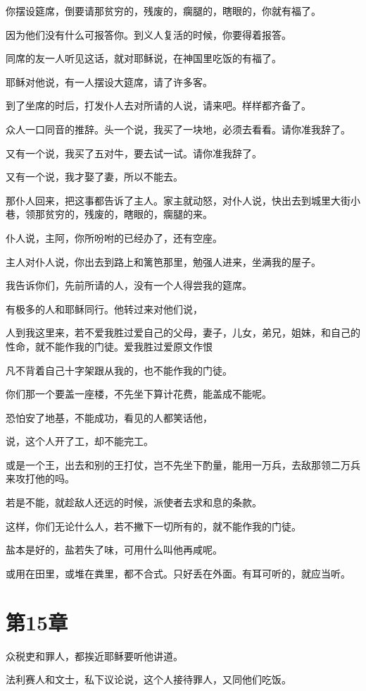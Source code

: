\documentclass[12pt,oneside]{book}
\begin{document}
你摆设筵席，倒要请那贫穷的，残废的，瘸腿的，瞎眼的，你就有福了。

因为他们没有什么可报答你。到义人复活的时候，你要得着报答。

同席的友一人听见这话，就对耶稣说，在神国里吃饭的有福了。

耶稣对他说，有一人摆设大筵席，请了许多客。

到了坐席的时后，打发仆人去对所请的人说，请来吧。样样都齐备了。

众人一口同音的推辞。头一个说，我买了一块地，必须去看看。请你准我辞了。

又有一个说，我买了五对牛，要去试一试。请你准我辞了。

又有一个说，我才娶了妻，所以不能去。

那仆人回来，把这事都告诉了主人。家主就动怒，对仆人说，快出去到城里大街小巷，领那贫穷的，残废的，瞎眼的，瘸腿的来。

仆人说，主阿，你所吩咐的已经办了，还有空座。

主人对仆人说，你出去到路上和篱笆那里，勉强人进来，坐满我的屋子。

我告诉你们，先前所请的人，没有一个人得尝我的筵席。

有极多的人和耶稣同行。他转过来对他们说，

人到我这里来，若不爱我胜过爱自己的父母，妻子，儿女，弟兄，姐妹，和自己的性命，就不能作我的门徒。爱我胜过爱原文作恨

凡不背着自己十字架跟从我的，也不能作我的门徒。

你们那一个要盖一座楼，不先坐下算计花费，能盖成不能呢。

恐怕安了地基，不能成功，看见的人都笑话他，

说，这个人开了工，却不能完工。

或是一个王，出去和别的王打仗，岂不先坐下酌量，能用一万兵，去敌那领二万兵来攻打他的吗。

若是不能，就趁敌人还远的时候，派使者去求和息的条款。

这样，你们无论什么人，若不撇下一切所有的，就不能作我的门徒。

盐本是好的，盐若失了味，可用什么叫他再咸呢。

或用在田里，或堆在粪里，都不合式。只好丢在外面。有耳可听的，就应当听。

\chapter{第15章}
众税吏和罪人，都挨近耶稣要听他讲道。

法利赛人和文士，私下议论说，这个人接待罪人，又同他们吃饭。
\end{document}
